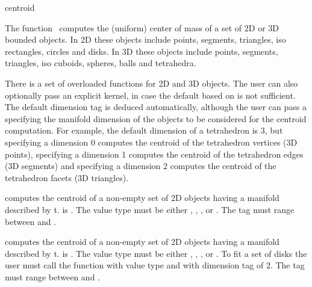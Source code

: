 
\begin{ccRefFunction}{centroid}  

\ccDefinition
  
The function \ccRefName\ computes the (uniform) center of mass of a set of 2D or 3D bounded objects. In 2D these objects include points, segments, triangles, iso rectangles, circles and disks. In 3D these objects include points, segments, triangles, iso cuboids, spheres, balls and tetrahedra.


There is a set of overloaded  functions for 2D and 3D objects. The user can also optionally pass an explicit kernel, in case the default based on  is not sufficient. The default dimension tag is deduced automatically, although the user can pass a  specifying the manifold dimension of the objects to be considered for the centroid computation. For example, the default dimension of a tetrahedron is 3, but specifying a dimension 0 computes the centroid of the tetrahedron vertices (3D points), specifying a dimension 1 computes the centroid of the tetrahedron edges (3D segments) and specifying a dimension 2 computes the centroid of the tetrahedron facets (3D triangles).


{ computes the centroid of a non-empty set of 2D objects having a manifold described by t.  is .  The value type must be either , , ,  or . The tag must range between  and .
 }

{ computes the centroid of a non-empty set of 2D objects having a manifold described by t.  is .  The value type must be either , , ,  or . To fit a set of disks the user must call the function with value type  and with dimension tag of 2. The tag must range between  and .
 }




\end{ccRefFunction}
